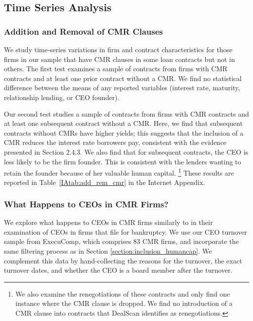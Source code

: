 \documentclass[a4paper,12pt]{article}
\begin{document}
\subsection{Time Series Analysis}

\subsubsection{Addition and Removal of CMR Clauses}

We study time-series variations in firm and contract characteristics for those firms in our sample that have CMR clauses in some loan contracts but not in others.
The first test examines a sample of contracts from firms with CMR contracts and at least one prior contract without a CMR.
We find no statistical difference between the means of any reported variables (interest rate, maturity, relationship lending, or CEO founder).

Our second test studies a sample of contracts from firms with CMR contracts and at least one subsequent contract without a CMR.
Here, we find that subsequent contracts without CMRs have higher yields; this suggests that the inclusion of a CMR reduces the interest rate borrowers pay, consistent with the evidence presented in Section 2.4.3.
We also find that for subsequent contracts, the CEO is less likely to be the firm founder.
This is consistent with the lenders wanting to retain the founder because of her valuable human capital.%
  \footnote{We also examine the renegotiations of these contracts and only find one instance where the CMR clause is dropped. We find no introduction of a CMR clause into contracts that DealScan identifies as renegotiations.}
These results are reported in Table~\ref{IAtab:add_rem_cmr} in the Internet Appendix. 


\subsubsection{What Happens to CEOs in CMR Firms?}

We explore what happens to CEOs in CMR firms similarly to \cite{Eckbo_2016} in their examination of CEOs in firms that file for bankruptcy.
We use our CEO turnover sample from ExecuComp, which comprises 83 CMR firms, and incorporate the same filtering process as in Section \ref{section:inclusion_humancap}.
We complement this data by hand-collecting the reasons for the turnover, the exact turnover dates, and whether the CEO is a board member after the turnover.
\end{document}
